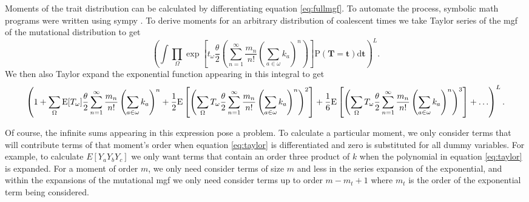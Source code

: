 Moments of the trait distribution can be calculated by differentiating equation
\eqref{eq:fullmgf}. To automate the process, symbolic math programs were written
using sympy \citep{sympy}. To derive moments for an arbitrary distribution of
coalescent times we take Taylor series of the mgf of the mutational distribution
to get
\begin{equation}
  \left(\int \prod_{\Omega} \exp\left[ t_{\omega} \frac{\theta}{2} \left(
    \sum_{n=1}^{\infty} \frac{m_n}{n!} \left( \sum_{a \in \omega} k_a \right)^n
    \right) \right] \mathrm{P}(\mathbf{T} = \mathbf{t}) \mathrm{d}\mathbf{t} \right)^L.
\end{equation}
We then also Taylor expand the exponential function appearing in this integral to get
\begin{equation} \label{eq:taylor}
  \tiny
  \left( 1 + \sum_{\Omega} \mathrm{E}[T_\omega] \frac{\theta}{2}
  \sum_{n=1}^{\infty} \frac{m_n}{n!} \left( \sum_{a \in \omega} k_a \right)^n +
  \frac{1}{2} \mathrm{E} \left[ \left( \sum_{\Omega} T_\omega \frac{\theta}{2}
    \sum_{n=1}^{\infty} \frac{m_n}{n!} \left( \sum_{a \in \omega} k_a
    \right)^n\right)^2 \right] + \frac{1}{6} \mathrm{E}\left[\left(
    \sum_{\Omega} T_\omega \frac{\theta}{2} \sum_{n=1}^{\infty} \frac{m_n}{n!}
    \left( \sum_{a \in \omega} k_a \right)^n \right)^3\right] + \ldots \right)^L.
\end{equation}

Of course, the infinite sums appearing in this expression pose a problem. To
calculate a particular moment, we only consider terms that will contribute terms
of that moment's order when equation \eqref{eq:taylor} is differentiated and
zero is substituted for all dummy variables. For example, to calculate
$E[Y_aY_bY_c]$ we only want terms that contain an order three product of $k$
when the polynomial in equation \eqref{eq:taylor} is expanded. For a moment of
order $m$, we only need consider terms of size $m$ and less in the series
expansion of the exponential, and within the expansions of the mutational mgf we
only need consider terms up to order $m-m_t+1$ where $m_t$ is the order of the
exponential term being considered.
